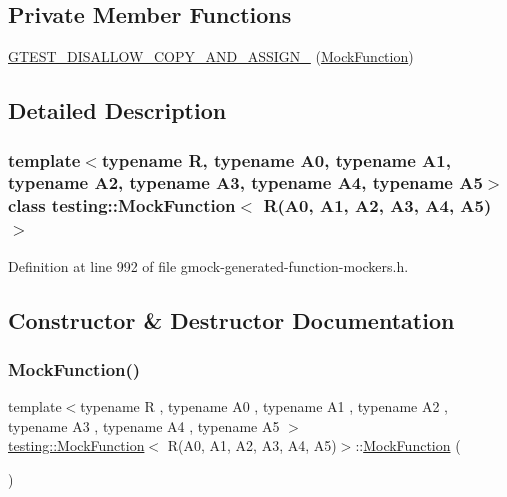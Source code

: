\subsection*{Private Member Functions}
\begin{DoxyCompactItemize}
\item 
\hyperlink{classtesting_1_1MockFunction_3_01R_07A0_00_01A1_00_01A2_00_01A3_00_01A4_00_01A5_08_4_a7634bc385fc1b89e053b991ec8672df9}{G\+T\+E\+S\+T\+\_\+\+D\+I\+S\+A\+L\+L\+O\+W\+\_\+\+C\+O\+P\+Y\+\_\+\+A\+N\+D\+\_\+\+A\+S\+S\+I\+G\+N\+\_\+} (\hyperlink{classtesting_1_1MockFunction}{Mock\+Function})
\end{DoxyCompactItemize}


\subsection{Detailed Description}
\subsubsection*{template$<$typename R, typename A0, typename A1, typename A2, typename A3, typename A4, typename A5$>$\newline
class testing\+::\+Mock\+Function$<$ R(\+A0, A1, A2, A3, A4, A5)$>$}



Definition at line 992 of file gmock-\/generated-\/function-\/mockers.\+h.



\subsection{Constructor \& Destructor Documentation}
\mbox{\label{classtesting_1_1MockFunction_3_01R_07A0_00_01A1_00_01A2_00_01A3_00_01A4_00_01A5_08_4_ae3e91041351fafbab8746662cc2fe8d6}} 
\subsubsection{\texorpdfstring{Mock\+Function()}{MockFunction()}}
{\footnotesize\ttfamily template$<$typename R , typename A0 , typename A1 , typename A2 , typename A3 , typename A4 , typename A5 $>$ \\
\hyperlink{classtesting_1_1MockFunction}{testing\+::\+Mock\+Function}$<$ R(A0, A1, A2, A3, A4, A5)$>$\+::\hyperlink{classtesting_1_1MockFunction}{Mock\+Function} (\begin{DoxyParamCaption}{ }\end{DoxyParamCaption})\hspace{0.3cm}{\ttfamily [inline]}}



